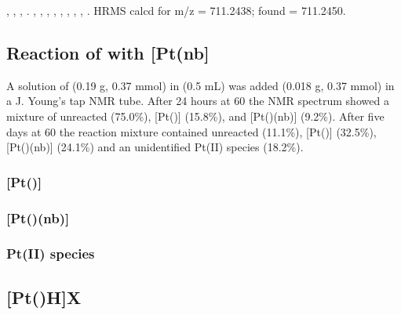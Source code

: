 ,
,
,
.
,
,
,
,
,
,
,
,
.
HRMS calcd for  m/z = 711.2438; found = 711.2450.

\subsection*{Reaction of \tBusixantphos{} with \texorpdfstring{[Pt(nb]} P}

A solution of \tBusixantphos{} (0.19 g, 0.37 mmol) in  (0.5 mL) was added \ce{[Pt(nb)3]} (0.018 g, 0.37 mmol) in a J. Young's tap NMR tube.  After 24 hours at 60\degC{} the \phosphorus{} NMR spectrum showed a mixture of unreacted \tBusixantphos{} (75.0\%), [Pt(\tBusixantphos)] (15.8\%), and [Pt(\tBusixantphos)(nb)] (9.2\%).  After five days at 60\degC{} the reaction mixture contained unreacted \tBusixantphos{} (11.1\%), [Pt(\tBusixantphos)] (32.5\%), [Pt(\tBusixantphos)(nb)] (24.1\%) and an unidentified Pt(II) species (18.2\%).  

\subsubsection*{[Pt(\tBusixantphos)]}


\subsubsection*{[Pt(\tBusixantphos)(nb)]}


\subsubsection*{Pt(II) \tBusixantphos{} species}


\subsection*{[Pt(\tBuxantphos)H]X}

